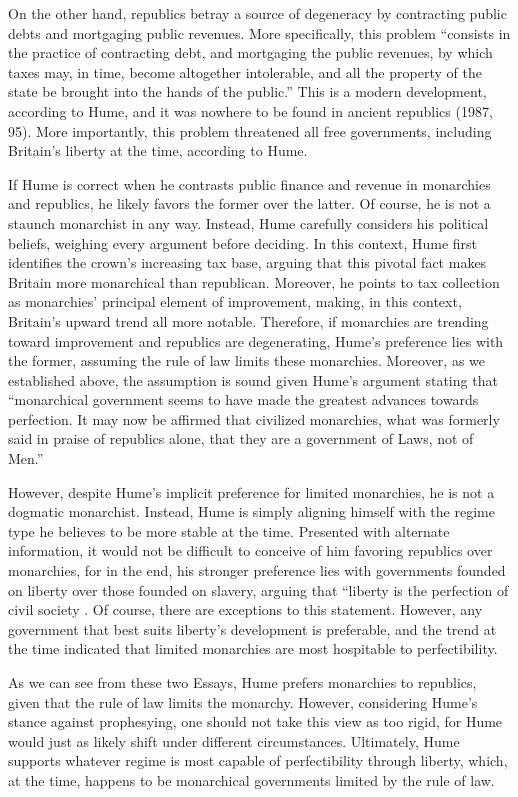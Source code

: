 \documentclass[authordate]{turabian-researchpaper}
\begin{document}
On the other hand, republics betray a source of degeneracy by contracting public debts and mortgaging public revenues.\autocite[95]{Hume_1985} More specifically, this problem “consists in the practice of contracting debt, and mortgaging the public revenues, by which taxes may, in time, become altogether intolerable, and all the property of the state be brought into the hands of the public.” \autocite[96]{Hume_1985} This is a modern development, according to Hume, and it was nowhere to be found in ancient republics (1987, 95). More importantly, this problem threatened all free governments, including Britain’s liberty at the time, according to Hume.\autocite[96]{Hume_1985}

If Hume is correct when he contrasts public finance and revenue in monarchies and republics, he likely favors the former over the latter. Of course, he is not a staunch monarchist in any way. Instead, Hume carefully considers his political beliefs, weighing every argument before deciding. In this context, Hume first identifies the crown’s increasing tax base, arguing that this pivotal fact makes Britain more monarchical than republican.\autocite[51]{Hume_1985} Moreover, he points to tax collection as monarchies’ principal element of improvement, making, in this context, Britain’s upward trend all more notable. Therefore, if monarchies are trending toward improvement and republics are degenerating, Hume’s preference lies with the former, assuming the rule of law limits these monarchies. Moreover, as we established above, the assumption is sound given Hume’s argument stating that “monarchical government seems to have made the greatest advances towards perfection. It may now be affirmed that civilized monarchies, what was formerly said in praise of republics alone, that they are a government of Laws, not of Men.”\autocite[94]{Hume_1985} 

However, despite Hume’s implicit preference for limited monarchies, he is not a dogmatic monarchist. Instead, Hume is simply aligning himself with the regime type he believes to be more stable at the time. Presented with alternate information, it would not be difficult to conceive of him favoring republics over monarchies, for in the end, his stronger preference lies with governments founded on liberty over those founded on slavery, arguing that “liberty is the perfection of civil society .\autocite[47]{Hume_1985} Of course, there are exceptions to this statement. However, any government that best suits liberty’s development is preferable, and the trend at the time indicated that limited monarchies are most hospitable to perfectibility. 

As we can see from these two Essays, Hume prefers monarchies to republics, given that the rule of law limits the monarchy. However, considering Hume’s stance against prophesying, one should not take this view as too rigid, for Hume would just as likely shift under different circumstances. Ultimately, Hume supports whatever regime is most capable of perfectibility through liberty, which, at the time, happens to be monarchical governments limited by the rule of law. 

\clearpage
\printbibliography
\end{document}
